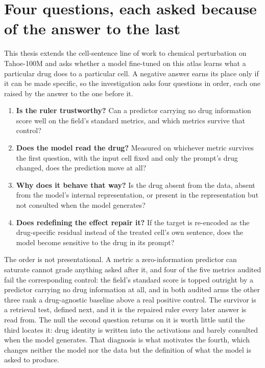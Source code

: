 \section{Four questions, each asked because of the answer to the last}
\label{sec:intro-map}

This thesis extends the cell-sentence line of work to chemical perturbation on
Tahoe-100M and asks whether a model fine-tuned on this atlas learns what a
particular drug does to a particular cell. A negative answer earns its place
only if it can be made specific, so the investigation asks four questions in
order, each one raised by the answer to the one before it.

\begin{enumerate}
  \item \textbf{Is the ruler trustworthy?} Can a predictor carrying no drug
        information score well on the field's standard metrics, and which
        metrics survive that control?
  \item \textbf{Does the model read the drug?} Measured on whichever metric
        survives the first question, with the input cell fixed and only the
        prompt's drug changed, does the prediction move at all?
  \item \textbf{Why does it behave that way?} Is the drug absent from the data,
        absent from the model's internal representation, or present in the
        representation but not consulted when the model generates?
  \item \textbf{Does redefining the effect repair it?} If the target is
        re-encoded as the drug-specific residual instead of the treated cell's
        own sentence, does the model become sensitive to the drug in its prompt?
\end{enumerate}

\noindent
The order is not presentational. A metric a zero-information predictor can
saturate cannot grade anything asked after it, and four of the five metrics
audited fail the corresponding control: the field's standard score is topped
outright by a predictor carrying no drug information at all, and in both audited
arms the other three rank a drug-agnostic baseline above a real positive
control. The survivor is a retrieval
test, defined next, and it is the repaired ruler every later answer is read
from. The null the second question returns on it is worth little until the third
locates it: drug identity is written into the activations and barely consulted
when the model generates. That diagnosis is what motivates the fourth, which
changes neither the model nor the data but the definition of what the model is
asked to produce.

